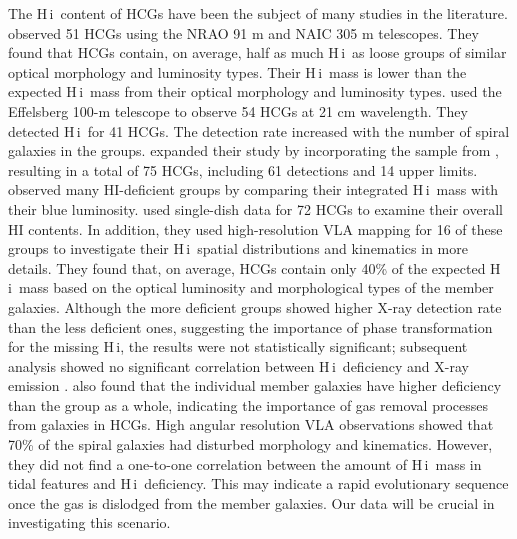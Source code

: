 \documentclass{aa}
\newcommand{\HI}{H\,{\sc i}}
\begin{document}
The \HI\ content of HCGs have been the subject of many studies in the literature. \citet{1987ApJS...63..265W} observed 51 HCGs using 
the NRAO 91 m and NAIC 305 m telescopes. They found that HCGs contain, on average, half as much \HI\ as loose groups of similar optical morphology and luminosity types. 
Their \HI\ mass is lower than the expected \HI\ mass from their optical morphology and luminosity types. \citet{1997A&A...325..473H} 
used the Effelsberg 100-m telescope to observe 54 HCGs at 21 cm wavelength. They detected \HI\ for 41 HCGs. 
The detection rate increased with the number of spiral galaxies in the groups. \citet{1997A&A...325..473H} expanded their study by 
incorporating the sample from \citet{1987ApJS...63..265W}, resulting in a total of 75 HCGs, including 61 detections and 14 upper limits. 
\citet{1997A&A...325..473H} observed many HI-deficient groups by comparing 
their integrated \HI\ mass with their blue luminosity. \citet{2001A&A...377..812V} used single-dish data for 72 HCGs to examine their overall HI contents. In addition, they used high-resolution VLA mapping for 16 of these groups to investigate their \HI\ spatial distributions and kinematics in more details. They found that, on average, HCGs contain only 40\% of the expected \HI\ mass based on the optical luminosity and morphological types of the member galaxies. Although the more deficient groups showed higher X-ray detection rate than the less deficient ones, suggesting the importance of phase transformation for the missing \HI, the results were not statistically significant; subsequent analysis showed no significant correlation between \HI\ deficiency and X-ray emission \citep{2008MNRAS.388.1245R}. \citet{2001A&A...377..812V} also found that the individual 
member galaxies have higher deficiency than the group as a whole, indicating the importance of gas removal processes from galaxies in HCGs. High angular resolution VLA observations showed that 70\% of the spiral galaxies had disturbed morphology and kinematics. However, they did not find a one-to-one 
correlation between the amount of \HI\ mass in tidal features and \HI\ deficiency. This may indicate a rapid evolutionary sequence once the gas is dislodged from the member galaxies. 
Our data will be crucial in investigating this scenario. \\
   
\end{document}
